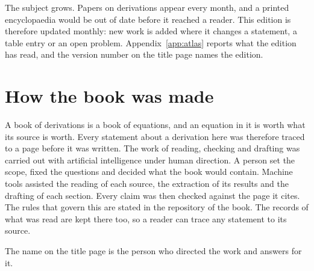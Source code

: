 The subject grows. %
Papers on derivations appear every month, and a printed encyclopaedia would be out of %
date before it reached a reader.
This edition is therefore updated monthly: new work is added where it changes a %
statement, a table entry or an open problem.
Appendix~\ref{app:atlas} reports what the edition has read, and the version
number on the title page names the edition.

\section*{How the book was made}

A book of derivations is a book of equations, and an equation in it is worth
what its source is worth. Every statement about a derivation here was therefore
traced to a page before it was written. The work of reading, checking and
drafting was carried out with artificial %
intelligence under human direction.
A person set the scope, fixed the questions and decided what the book would %
contain.
Machine tools assisted the reading of each source, the extraction of its results %
and the drafting of each section.
Every claim was then checked against the page it cites. %
The rules that govern this are stated in the repository of the book. %
The records of what was read are kept there too, so a reader can trace any %
statement to its source.

The name on the title page is the person who directed the work and answers for
it.
